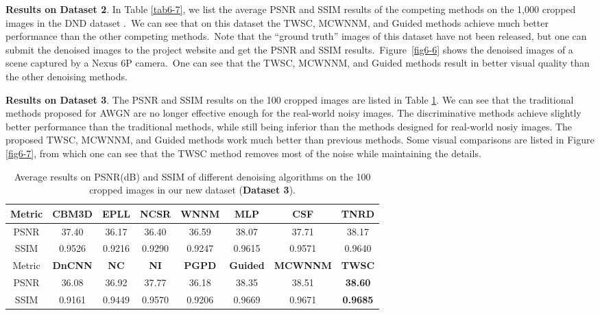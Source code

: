 \textbf{Results on Dataset 2}. In Table \ref{tab6-7}, we list the average PSNR and SSIM results of the competing methods on the 1,000 cropped images in the DND dataset \cite{dnd2017}.\ We can see that on this dataset the TWSC, MCWNNM, and Guided methods achieve much better performance than the other competing methods.\ Note that the ``ground truth'' images of this dataset have not been released, but one can submit the denoised images to the project website and get the PSNR and SSIM results.\ Figure\ \ref{fig6-6} shows the denoised images of a scene captured by a Nexus 6P camera.\ One can see that the TWSC, MCWNNM, and Guided methods result in better visual quality than the other denoising methods.

\textbf{Results on Dataset 3}.
The PSNR and SSIM \cite{ssim} results on the 100 cropped images are listed in Table \ref{tab6-8}. We can see that the traditional methods proposed for AWGN are no longer effective enough for the real-world noisy images. The discriminative methods achieve slightly better performance than the traditional methods, while still being inferior than the methods designed for real-world nosiy images. The proposed TWSC, MCWNNM, and Guided methods work much better than previous methods. Some visual comparisons are listed in Figure \ref{fig6-7}, from which one can see that the TWSC method removes most of the noise while maintaining the details. 

\begin{table}[t!]
\caption{Average results on PSNR(dB) and SSIM of different denoising algorithms on the 100 cropped images in our new dataset (\textbf{Dataset 3}).}
\footnotesize
\label{tab6-8}
\begin{center}
\renewcommand\arraystretch{1.2}
\begin{tabular*}{1\textwidth}{@{\extracolsep{\fill}}cccccccc}
\hline
Metric
&
\textbf{CBM3D}
&
\textbf{EPLL}
&
\textbf{NCSR}
&
\textbf{WNNM}
&
\textbf{MLP}
&
\textbf{CSF}
&
\textbf{TNRD}
\\
\hline
PSNR & 37.40 & 36.17 & 36.40 & 36.59 & 38.07 & 37.71 & 38.17 
\\
\hline
SSIM & 0.9526 & 0.9216 & 0.9290 & 0.9247 & 0.9615 & 0.9571 & 0.9640
\\
\hline
Metric
&
\textbf{DnCNN}
&
\textbf{NC}
&
\textbf{NI}
&
\textbf{PGPD}
&
\textbf{Guided}
&
\textbf{MCWNNM}
&
\textbf{TWSC}
\\
\hline
PSNR & 36.08 & 36.92  &  37.77 & 36.18 & 38.35 & 38.51 & \textbf{38.60}
\\
\hline
SSIM & 0.9161 & 0.9449  & 0.9570  & 0.9206 & 0.9669 & 0.9671 & \textbf{0.9685}
\\
\hline
\end{tabular*}
\end{center}
\end{table}


